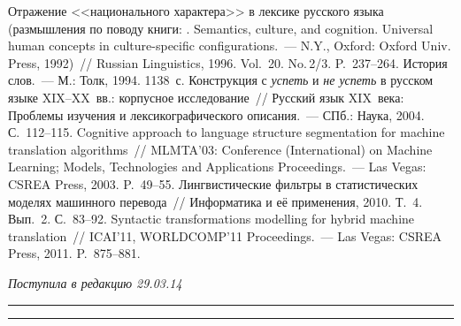 \begin{multicols}{2}
{{\begin{thebibliography}{99}
Отражение <<национального характера>> в лексике русского языка
(размышления по поводу книги: . Semantics, culture, and
cognition. Universal human concepts in culture-specific configurations.~--- N.Y.,
Oxford: Oxford Univ. Press, 1992)~// Russian Linguistics, 1996. Vol.~20. No.\,2/3.
P.~237--264.
 История слов.~--- М.: Толк, 1994. 1138~с.
Конструкция с \textit{успеть} и \textit{не успеть} в русском языке
XIX--XX~вв.: корпусное исследование~// Русский язык XIX~века: Проб\-ле\-мы
изучения и лексикографического описания.~--- СПб.: Наука, 2004. С.~112--115.
 Cognitive approach to language structure segmentation for machine translation
algorithms~// MLMTA'03:  Conference (International) on Machine
Learning; Models, Technologies and Applications Proceedings.~--- Las Vegas: CSREA Press,
2003. P.~49--55.
Лингвистические фильтры в статистических моделях машинного перевода~//
Информатика и её применения, 2010. Т.~4. Вып.~2. С.~83--92.
 Syntactic transformations modelling for hybrid machine translation~//
ICAI'11, WORLDCOMP'11 Proceedings.~--- Las Vegas: CSREA Press, 2011.
P.~875--881.

\end{thebibliography}
} }

\end{multicols}

\vspace*{-6pt}

\hfill{\small\textit{Поступила в редакцию 29.03.14}}



\vspace*{12pt}

\hrule

\vspace*{2pt}

\hrule

\def\tit{INFORMATION TECHNOLOGIES FOR~CORPUS STUDIES:
UNDERPINNINGS FOR~CROSS-LINGUISTIC DATABASE CREATION }

\def\titkol{Information technologies for corpus studies: Underpinnings for
cross-linguistic database creation}

\def\aut{N.\,V.~Buntman$^1$, Anna A.~Zaliznyak$^{2,3}$, I.\,M.~Zatsman$^3$,
 M.\,G.~Kruzhkov$^3$, E.\,Yu.~Loshchilova$^3$, and~D.\,V.~Sitchinava$^4$}

